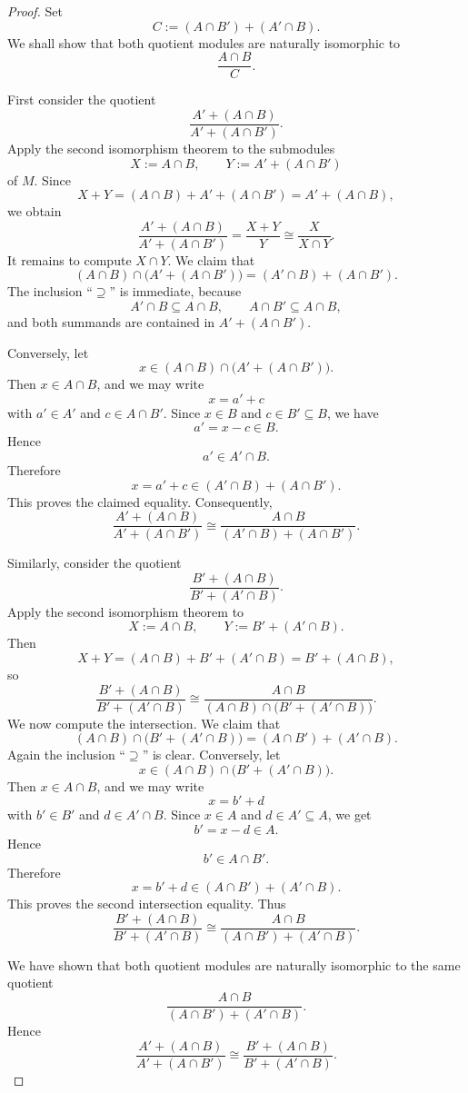 \begin{proof}
    Set
    \[
        C:=(A\cap B')+(A'\cap B).
    \]
    We shall show that both quotient modules are naturally isomorphic to
    \[
        \frac{A\cap B}{C}.
    \]

    First consider the quotient
    \[
        \frac{A'+(A\cap B)}{A'+(A\cap B')}.
    \]
    Apply the second isomorphism theorem to the submodules
    \[
        X:=A\cap B,
        \qquad
        Y:=A'+(A\cap B')
    \]
    of $M$. Since
    \[
        X+Y=(A\cap B)+A'+(A\cap B')=A'+(A\cap B),
    \]
    we obtain
    \[
        \frac{A'+(A\cap B)}{A'+(A\cap B')}
        =
        \frac{X+Y}{Y}
        \cong
        \frac{X}{X\cap Y}.
    \]
    It remains to compute $X\cap Y$. We claim that
    \[
        (A\cap B)\cap \bigl(A'+(A\cap B')\bigr)
        =
        (A'\cap B)+(A\cap B').
    \]
    The inclusion ``$\supseteq$'' is immediate, because
    \[
        A'\cap B\subseteq A\cap B,
        \qquad
        A\cap B'\subseteq A\cap B,
    \]
    and both summands are contained in $A'+(A\cap B')$.

    Conversely, let
    \[
        x\in (A\cap B)\cap \bigl(A'+(A\cap B')\bigr).
    \]
    Then $x\in A\cap B$, and we may write
    \[
        x=a'+c
    \]
    with $a'\in A'$ and $c\in A\cap B'$. Since $x\in B$ and $c\in B'\subseteq B$, we have
    \[
        a'=x-c\in B.
    \]
    Hence
    \[
        a'\in A'\cap B.
    \]
    Therefore
    \[
        x=a'+c\in (A'\cap B)+(A\cap B').
    \]
    This proves the claimed equality. Consequently,
    \[
        \frac{A'+(A\cap B)}{A'+(A\cap B')}
        \cong
        \frac{A\cap B}{(A'\cap B)+(A\cap B')}.
    \]

    Similarly, consider the quotient
    \[
        \frac{B'+(A\cap B)}{B'+(A'\cap B)}.
    \]
    Apply the second isomorphism theorem to
    \[
        X:=A\cap B,
        \qquad
        Y:=B'+(A'\cap B).
    \]
    Then
    \[
        X+Y=(A\cap B)+B'+(A'\cap B)=B'+(A\cap B),
    \]
    so
    \[
        \frac{B'+(A\cap B)}{B'+(A'\cap B)}
        \cong
        \frac{A\cap B}{(A\cap B)\cap \bigl(B'+(A'\cap B)\bigr)}.
    \]
    We now compute the intersection. We claim that
    \[
        (A\cap B)\cap \bigl(B'+(A'\cap B)\bigr)
        =
        (A\cap B')+(A'\cap B).
    \]
    Again the inclusion ``$\supseteq$'' is clear. Conversely, let
    \[
        x\in (A\cap B)\cap \bigl(B'+(A'\cap B)\bigr).
    \]
    Then $x\in A\cap B$, and we may write
    \[
        x=b'+d
    \]
    with $b'\in B'$ and $d\in A'\cap B$. Since $x\in A$ and $d\in A'\subseteq A$, we get
    \[
        b'=x-d\in A.
    \]
    Hence
    \[
        b'\in A\cap B'.
    \]
    Therefore
    \[
        x=b'+d\in (A\cap B')+(A'\cap B).
    \]
    This proves the second intersection equality. Thus
    \[
        \frac{B'+(A\cap B)}{B'+(A'\cap B)}
        \cong
        \frac{A\cap B}{(A\cap B')+(A'\cap B)}.
    \]

    We have shown that both quotient modules are naturally isomorphic to the same
    quotient
    \[
        \frac{A\cap B}{(A\cap B')+(A'\cap B)}.
    \]
    Hence
    \[
        \frac{A'+(A\cap B)}{A'+(A\cap B')}
        \cong
        \frac{B'+(A\cap B)}{B'+(A'\cap B)}.
    \]
\end{proof}

